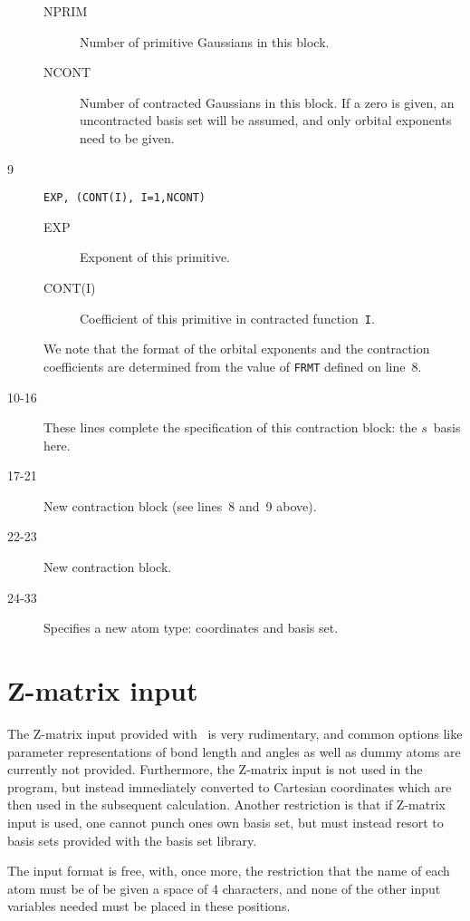 \begin{description}
\begin{description}
\item[NPRIM] Number of primitive
Gaussians in this block. 
\item[NCONT] Number of contracted
Gaussians in this block. If a zero 
is given, an uncontracted basis set will be assumed, and only orbital
exponents need to be given.
\end{description}
\item[9] \verb|EXP, (CONT(I), I=1,NCONT)|
\begin{description}
\item[EXP] Exponent of this primitive.
\item[CONT(I)] Coefficient of this primitive in contracted
function~{\tt I}.
\end{description}
We note that the format of the orbital exponents and the contraction 
coefficients are determined from the value of {\tt FRMT} defined on
line~8.
\item[10-16] These lines complete the specification of this
contraction block: the $s$~basis here.
\item[17-21] New contraction block (see lines~8 and~9 above).
\item[22-23] New contraction block.
\item[24-33] Specifies a new atom type: coordinates and basis set.
\end{description}

\section{Z-matrix input}\label{sec:molzmat}

The Z-matrix input provided with \siraba\ is
very rudimentary, and 
common options like parameter representations of bond length and
angles as well as dummy atoms are currently not provided. Furthermore,
the Z-matrix input is not used in the program, but instead immediately
converted to Cartesian coordinates which are then used in the
subsequent calculation.
Another restriction is that if Z-matrix input is used, one cannot
punch ones own basis set, but must instead resort to basis sets
provided with the basis set library.

The input format is free, with, once more,
the restriction that the name of each atom must be of be given a space
of 4 characters, and none of the other input variables needed must be
placed in these positions.

